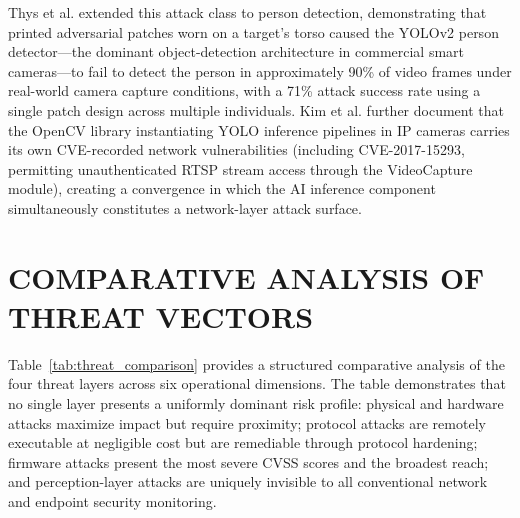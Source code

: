 \documentclass[letterpaper, 10pt, conference]{ieeeconf}
\begin{document}
Thys et al. \cite{thys2019} extended this attack class to person
detection, demonstrating that printed adversarial patches worn
on a target's torso caused the YOLOv2 person detector---the
dominant object-detection architecture in commercial smart cameras---to
fail to detect the person in approximately 90\% of video frames
under real-world camera capture conditions, with a 71\% attack success
rate using a single patch design across multiple individuals. Kim et
al. \cite{yolo2025} further document that the OpenCV library
instantiating YOLO inference pipelines in IP cameras carries its own
CVE-recorded network vulnerabilities (including CVE-2017-15293,
permitting unauthenticated RTSP stream access through the
VideoCapture module), creating a convergence in which the AI inference
component simultaneously constitutes a network-layer attack surface.

\section{COMPARATIVE ANALYSIS OF THREAT VECTORS}

Table~\ref{tab:threat_comparison} provides a structured comparative
analysis of the four threat layers across six operational dimensions.
The table demonstrates that no single layer presents a uniformly
dominant risk profile: physical and hardware attacks maximize impact
but require proximity; protocol attacks are remotely executable at
negligible cost but are remediable through protocol hardening; firmware
attacks present the most severe CVSS scores and the broadest reach;
and perception-layer attacks are uniquely invisible to all conventional
network and endpoint security monitoring.
\end{document}
